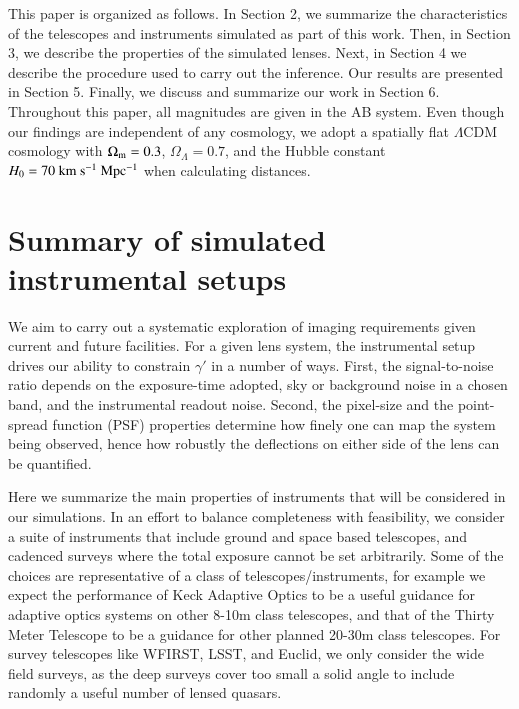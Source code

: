 \documentclass[a4paper,11pt]{article}
\begin{document}
{This paper is organized as follows. In Section 2, we summarize the
characteristics of the telescopes and instruments simulated as part of
this work. Then, in Section 3, we describe the properties of the
simulated lenses. Next, in Section 4 we describe the procedure used to
carry out the inference.  Our results are presented in Section
5. Finally, we discuss and summarize our work in Section 6. Throughout
this paper, all magnitudes are given in the AB system. Even though our
findings are independent of any cosmology, we adopt a spatially flat
$\Lambda$CDM cosmology with $\Omega_{\rm{m}} = 0.3$, $\Omega_{\Lambda}
= 0.7$, and the Hubble constant $H_{0} = 70~\rm km~s^{-1}~Mpc^{-1}$
when calculating distances.



\section{Summary of simulated instrumental setups}

We aim to carry out a systematic exploration of imaging requirements
given current and future facilities. For a given lens system, the
instrumental setup drives our ability to constrain $\gamma'$ in a
number of ways. First, the signal-to-noise ratio depends on the
exposure-time adopted, sky or background noise in a chosen band, and
the instrumental readout noise. Second, the pixel-size and the
point-spread function (PSF) properties determine how finely one can
map the system being observed, hence how robustly the deflections on
either side of the lens can be quantified.

Here we summarize the main properties of instruments that will be
considered in our simulations. In an effort to balance completeness
with feasibility, we consider a suite of instruments that include
ground and space based telescopes, and cadenced surveys where the
total exposure cannot be set arbitrarily. Some of the choices are
representative of a class of telescopes/instruments, for example we
expect the performance of Keck Adaptive Optics to be a useful guidance
for adaptive optics systems on other 8-10m class telescopes, and that
of the Thirty Meter Telescope to be a guidance for other planned
20-30m class telescopes. For survey telescopes like WFIRST, LSST, and
Euclid, we only consider the wide field surveys, as the deep surveys
cover too small a solid angle to include randomly a useful number of
lensed quasars.

}
\end{document}
